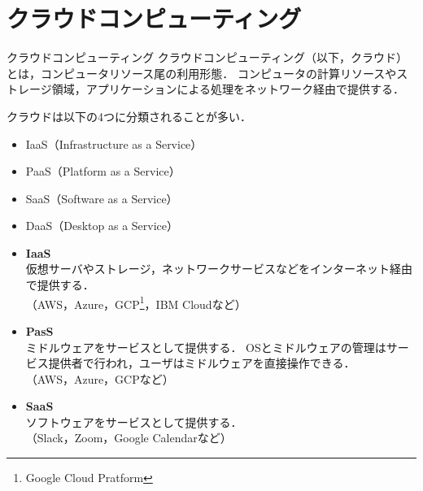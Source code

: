 \section{クラウドコンピューティング}
\tocc
\begin{frame}[t]{\fftitle}
    \begin{block}{クラウドコンピューティング}
        クラウドコンピューティング（以下，クラウド）とは，コンピュータリソース尾の利用形態．
        コンピュータの計算リソースやストレージ領域，アプリケーションによる処理をネットワーク経由で提供する．\hfill\cite{2015amazon}
    \end{block}
    クラウドは以下の4つに分類されることが多い．
    \begin{itemize}
        \setlength{\itemsep}{1em}
        \item IaaS（Infrastructure as a Service）
        \item PaaS（Platform as a Service）
        \item SaaS（Software as a Service）
        \item DaaS（Desktop as a Service）%
    \end{itemize}
\end{frame}
\begin{frame}[t]{\fftitle}
    \begin{itemize}
        \item \textbf{IaaS}\\
              仮想サーバやストレージ，ネットワークサービスなどをインターネット経由で提供する．\\（AWS，Azure，GCP\footnote{Google Cloud Pratform}，IBM Cloudなど）
        \item \textbf{PasS}\\
              ミドルウェアをサービスとして提供する．
              OSとミドルウェアの管理はサービス提供者で行われ，ユーザはミドルウェアを直接操作できる．\\（AWS，Azure，GCPなど）
        \item \textbf{SaaS}\\
              ソフトウェアをサービスとして提供する．\\（Slack，Zoom，Google Calendarなど）
    \end{itemize}
    \hfill\cite{2015amazon}
\end{frame}

